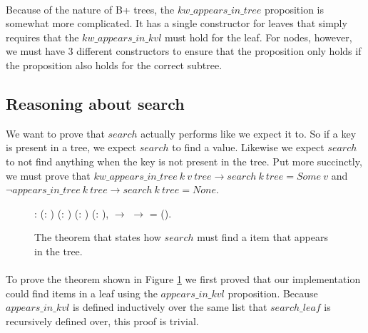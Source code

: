 \paragraph{}
Because of the nature of B+ trees, the $kw\_appears\_in\_tree$ proposition is somewhat more complicated. It has a single constructor for leaves that simply requires that the $kw\_appears\_in\_kvl$ must hold for the leaf. For nodes, however, we must have 3 different constructors to ensure that the proposition only holds if the proposition also holds for the correct subtree.

\subsection{Reasoning about search}
We want to prove that $search$ actually performs like we expect it to. So if a key is present in a tree, we expect $search$ to find a value. Likewise we expect $search$ to not find anything when the key is not present in the tree.
Put more succinctly, we must prove that $kw\_appears\_in\_tree~k~v~tree \rightarrow search~k~tree = Some~v$ and $\lnot appears\_in\_tree~k~tree \rightarrow search~k~tree = None$.

\begin{figure}
  \begin{coqdoccode}
  \coqdocnoindent
    : \coqdockw{\ensuremath{\forall}} (: ) (: ) (:   ) (: ),\coqdoceol
  \coqdocindent{1.00em}
      \ensuremath{\rightarrow} \coqdoceol
  \coqdocindent{1.00em}
      \ensuremath{\rightarrow} \coqdoceol
  \coqdocindent{1.00em}
    = ().\coqdoceol
  \end{coqdoccode}
  \caption{The theorem that states how $search$ must find a item that appears in the tree.}
  \label{fig:search_works}
\end{figure}

\paragraph{}
To prove the theorem shown in Figure \ref{fig:search_works} we first proved that our implementation could find items in a leaf using the $appears\_in\_kvl$ proposition. Because $appears\_in\_kvl$ is defined inductively over the same list that $search\_leaf$ is recursively defined over, this proof is trivial.

